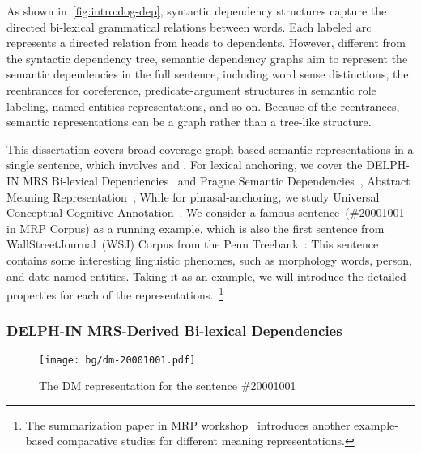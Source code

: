 As shown in~\autoref{fig:intro:dog-dep}, syntactic dependency
structures capture the directed bi-lexical grammatical relations
between words. Each labeled arc represents a directed relation from
heads to dependents. However, different from the syntactic dependency
tree, semantic dependency graphs aim to represent the semantic
dependencies in the full sentence, including word sense distinctions,
the reentrances for coreference, predicate-argument structures in
semantic role labeling, named entities representations, and so
on. Because of the reentrances, semantic representations can be a
graph rather than a tree-like structure.

This dissertation covers broad-coverage graph-based semantic
representations in a single sentence, which involves
 and . For lexical
anchoring, we cover the DELPH-IN MRS Bi-lexical
Dependencies~\cite[DM,][]{Iva:Oep:Ovr:12} and Prague Semantic
Dependencies~\cite[PSD,][]{hajic2012announcing,miyao2014house},
Abstract Meaning Representation~\cite[AMR,][]{Ban:Bon:Cai:13}; While
for phrasal-anchoring, we study Universal Conceptual Cognitive
Annotation~\cite[UCCA,][]{Abe:Rap:13b}. We consider a famous
sentence~(\#20001001 in MRP Corpus) as a running example, which is
also the first sentence from WallStreetJournal~(WSJ) Corpus from the
Penn Treebank~\citep{Mar:San:Mar:93}: \emph{} This sentence contains some interesting linguistic
phenomes, such as morphology words, person, and date named
entities. Taking it as an example, we will introduce the detailed
properties for each of the representations.~\footnote{The
  summarization paper in MRP workshop~\citep{Mar:San:Mar:93}
  introduces another example-based comparative studies for different
  meaning representations.}


\subsubsection{DELPH-IN MRS-Derived Bi-lexical Dependencies}
\label{sssec:bg:dm}

\begin{figure}[!tbp]
\centering
\texttt{[image: bg/dm-20001001.pdf]}
\caption{\label{fig:bg:dm}The DM representation for the sentence
  \#20001001}
\end{figure}

